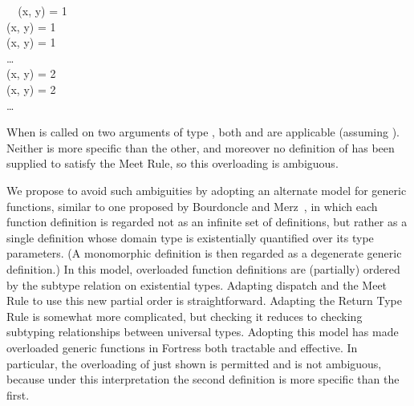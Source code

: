 \documentclass[10pt]{sigplanconf}
\begin{document}
\small\begin{FortressCode}
{\tt ~~}\+(x\COLON {}, y\COLON {})\COLON {} = 1 \\
  (x\COLON {}, y\COLON {})\COLON {} = 1 \\
  (x\COLON {}, y\COLON {})\COLON {} = 1 \\
  \ldots \\
  (x\COLON {}, y\COLON {})\COLON {} = 2 \\
  (x\COLON {}, y\COLON {})\COLON {} = 2 \\
  \ldots\-
\end{FortressCode}
\normalsize
When  is called on two arguments of type , 
both  and  are applicable
(assuming ).
Neither is more specific than the other,
and moreover no definition of
has been
supplied to satisfy the Meet Rule, so this overloading is ambiguous.


We propose to avoid such ambiguities 
by adopting an alternate model for generic functions, 
similar to one proposed by Bourdoncle and Merz~\cite{bourdoncle97},
in which each function definition 
is regarded not as an infinite set of definitions, but rather
as a single definition whose domain type is
existentially quantified over its type parameters.
(A monomorphic definition is then regarded as a degenerate generic definition.)
In this model, 
overloaded function definitions are (partially) ordered 
by the subtype relation on existential types.
Adapting dispatch and the Meet Rule to use this new partial order is straightforward.
Adapting the Return Type Rule is somewhat more complicated, 
but checking it reduces to checking subtyping relationships 
between universal types.
Adopting this model has made overloaded generic functions in Fortress
both tractable and effective.
In particular, the overloading of  just shown is permitted and
is not ambiguous, because under this interpretation the second definition
is more specific than the first.

\end{document}
